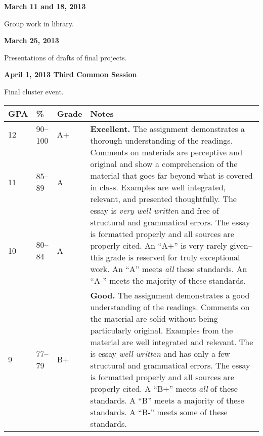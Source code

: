 \documentclass[12pt]{article}
\begin{document}
\textbf{March 11 and 18, 2013}

Group work in library.

\textbf{March 25, 2013}

Presentations of drafts of final projects.

\textbf{April 1, 2013 \hspace{.125in} Third Common Session}

Final cluster event.

\newpage

{\footnotesize
\begin{tabular}{|l|l|l|l|}
\hline
\textbf{GPA} & \textbf{\%} & \textbf{Grade} & \textbf{Notes} \\
\hline
\multirow{3}{*}{12} & \multirow{3}{*}{90--100} & \multirow{3}{*}{A+} & \multirow{10}{4in}{\textbf{Excellent.} The assignment demonstrates a thorough understanding of the readings. Comments on materials are perceptive and original and show a comprehension of the material that goes far beyond what is covered in class. Examples are well integrated, relevant, and presented thoughtfully. The essay is \textit{very well written} and free of structural and grammatical errors. The essay is formatted properly and all sources are properly cited. An ``A+'' is very rarely given--this grade is reserved for truly exceptional work. An ``A'' meets \textit{all} these standards. An ``A-'' meets the majority of these standards.} \\ 
& & & \\
& & & \\
\multirow{3}{*}{11} & \multirow{3}{*}{85--89} & \multirow{3}{*}{A} & \\
& & & \\
& & & \\
\multirow{3}{*}{10} & \multirow{3}{*}{80--84} & \multirow{3}{*}{A-} & \\ 
& & & \\
& & & \\
& & & \\
\hline
\multirow{3}{*}{9} & \multirow{3}{*}{77--79} & \multirow{3}{*}{B+} & \multirow{9}{4in}{\textbf{Good.} The assignment demonstrates a good understanding of the readings. Comments on the material are solid without being particularly original. Examples from the material are well integrated and relevant. The is essay \textit{well written} and has only a few structural and grammatical errors. The essay is formatted properly and all sources are properly cited. A ``B+'' meets \textit{all} of these standards. A ``B'' meets a majority of these standards. A ``B-'' meets some of these standards.}\\

\end{tabular}}
\end{document}
